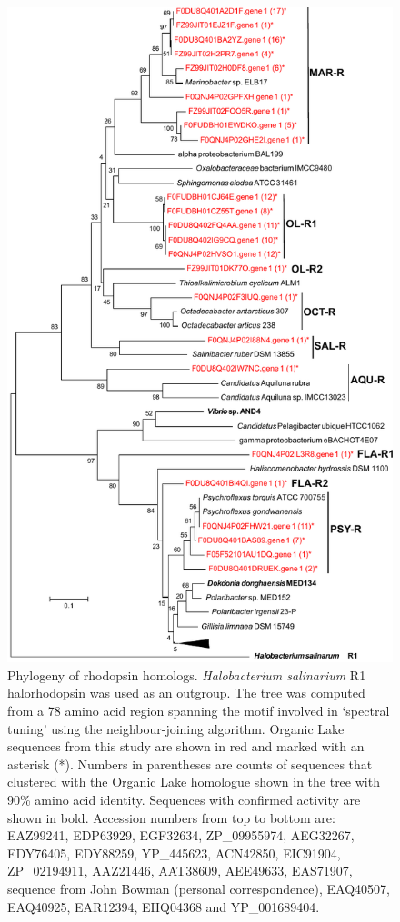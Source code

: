 \begin{figure}
\includegraphics{orglake_figures/rhodopsin_tree.pdf}
\caption[Phylogeny of rhodopsin homologues]{Phylogeny of rhodopsin homologs. \emph{Halobacterium salinarium} R1 halorhodopsin was used as an outgroup. The tree was computed from a 78 amino acid region spanning the motif involved in `spectral tuning' using the neighbour-joining algorithm. Organic Lake sequences from this study are shown in red and marked with an asterisk (*). Numbers in parentheses are counts of sequences that clustered with the Organic Lake homologue shown in the tree with 90\% amino acid identity. Sequences with confirmed activity are shown in bold. Accession numbers from top to bottom are: EAZ99241, EDP63929, EGF32634, ZP\_09955974, AEG32267, EDY76405, EDY88259, YP\_445623, ACN42850, EIC91904, ZP\_02194911, AAZ21446, AAT38609, AEE49633, EAS71907, sequence from John Bowman (personal correspondence), EAQ40507, EAQ40925, EAR12394, EHQ04368 and YP\_001689404.}
\label{fig:rhodopsin_tree}

\end{figure}
